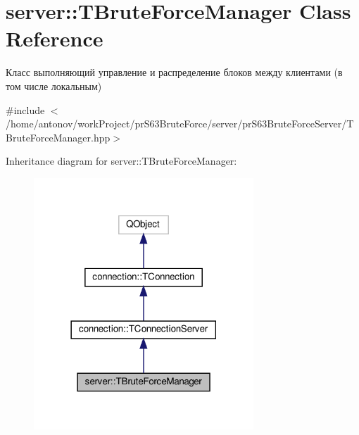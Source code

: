 \hypertarget{classserver_1_1_t_brute_force_manager}{}\section{server\+:\+:T\+Brute\+Force\+Manager Class Reference}
\label{classserver_1_1_t_brute_force_manager}


Класс выполняющий управление и распределение блоков между клиентами (в том числе локальным)  




{\ttfamily \#include $<$/home/antonov/work\+Project/pr\+S63\+Brute\+Force/server/pr\+S63\+Brute\+Force\+Server/\+T\+Brute\+Force\+Manager.\+hpp$>$}



Inheritance diagram for server\+:\+:T\+Brute\+Force\+Manager\+:\nopagebreak
\begin{figure}[H]
\begin{center}
\leavevmode
\includegraphics[width=234pt]{classserver_1_1_t_brute_force_manager__inherit__graph}
\end{center}
\end{figure}


